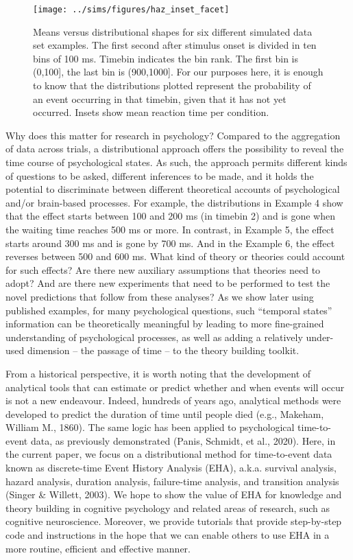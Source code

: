 \documentclass[
  man, donotrepeattitle,floatsintext]{apa6}
\begin{document}
\begin{figure}[H]

{\centering \texttt{[image: ../sims/figures/haz\_inset\_facet]} 

}

\caption{Means versus distributional shapes for six different simulated data set examples. The first second after stimulus onset is divided in ten bins of 100 ms. Timebin indicates the bin rank. The first bin is (0,100{]}, the last bin is (900,1000{]}. For our purposes here, it is enough to know that the distributions plotted represent the probability of an event occurring in that timebin, given that it has not yet occurred. Insets show mean reaction time per condition.}\label{fig:plot1}
\end{figure}

Why does this matter for research in psychology? Compared to the aggregation of data across trials, a distributional approach offers the possibility to reveal the time course of psychological states. As such, the approach permits different kinds of questions to be asked, different inferences to be made, and it holds the potential to discriminate between different theoretical accounts of psychological and/or brain-based processes.
For example, the distributions in Example 4 show that the effect starts between 100 and 200 ms (in timebin 2) and is gone when the waiting time reaches 500 ms or more. In contrast, in Example 5, the effect starts around 300 ms and is gone by 700 ms. And in the Example 6, the effect reverses between 500 and 600 ms. What kind of theory or theories could account for such effects? Are there new auxiliary assumptions that theories need to adopt? And are there new experiments that need to be performed to test the novel predictions that follow from these analyses? As we show later using published examples, for many psychological questions, such ``temporal states'' information can be theoretically meaningful by leading to more fine-grained understanding of psychological processes, as well as adding a relatively under-used dimension -- the passage of time -- to the theory building toolkit.

From a historical perspective, it is worth noting that the development of analytical tools that can estimate or predict whether and when events will occur is not a new endeavour.
Indeed, hundreds of years ago, analytical methods were developed to predict the duration of time until people died (e.g., Makeham, William M., 1860).
The same logic has been applied to psychological time-to-event data, as previously demonstrated (Panis, Schmidt, et al., 2020).
Here, in the current paper, we focus on a distributional method for time-to-event data known as discrete-time Event History Analysis (EHA), a.k.a. survival analysis, hazard analysis, duration analysis, failure-time analysis, and transition analysis (Singer \& Willett, 2003). We hope to show the value of EHA for knowledge and theory building in cognitive psychology and related areas of research, such as cognitive neuroscience. Moreover, we provide tutorials that provide step-by-step code and instructions in the hope that we can enable others to use EHA in a more routine, efficient and effective manner.
\end{document}

